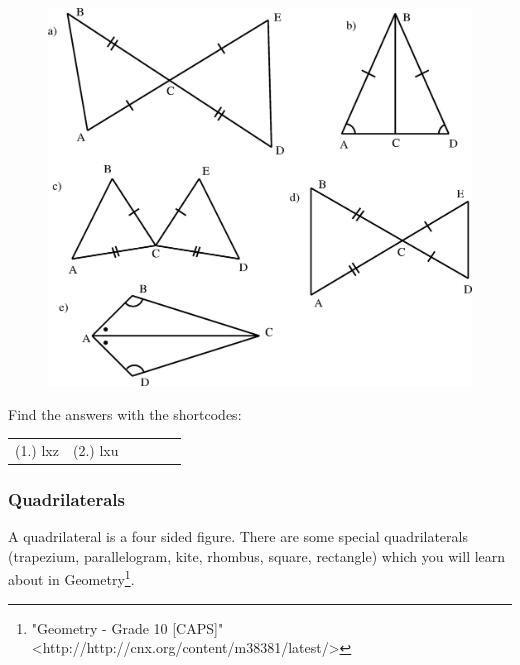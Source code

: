 \begin{enumerate}[noitemsep, label=\textbf{\arabic*}. ]
    \setcounter{subfigure}{0}
	\begin{figure}[H] %
    \begin{center}
    \label{m39368*id318571!!!underscore!!!media}\label{m39368*id318571!!!underscore!!!printimage}\includegraphics{col11306.imgs/m39368_MG10C13_039.png} %
      \vspace{2pt}
    \vspace{.1in}
    \end{center}
 \end{figure}               \end{enumerate}
      \label{m39368*eip-75}
\par {} Find the answers with the shortcodes:
 \par \begin{tabular}[h]{cccccc}
 (1.) lxz  &  (2.) lxu  & \end{tabular}
            \subsubsection{ Quadrilaterals}
            \nopagebreak
            \label{m39368*eip-366}
A quadrilateral is a four sided figure. There are some special quadrilaterals (trapezium, parallelogram, kite, rhombus, square, rectangle) which you will learn about in Geometry\footnote{\raggedright{}"Geometry - Grade 10 [CAPS]" <http://http://cnx.org/content/m38381/latest/>}. 
\par \label{m39368*uid91}
